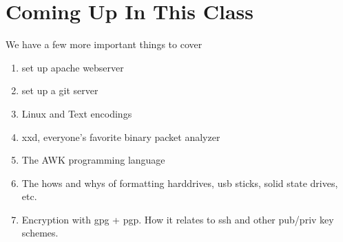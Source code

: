 \documentclass[10pt]{article}
\begin{document}
\section{Coming Up In This Class}

We have a few more important things to cover
\begin{enumerate}
\item set up apache webserver
\item set up a git server
\item Linux and Text encodings
\item xxd, everyone's favorite binary packet analyzer
\item The AWK programming language
\item The hows and whys of formatting harddrives, usb sticks, solid state drives, etc.
\item Encryption with gpg + pgp. How it relates to ssh and other pub/priv key schemes.
\end{enumerate}
\end{document}

